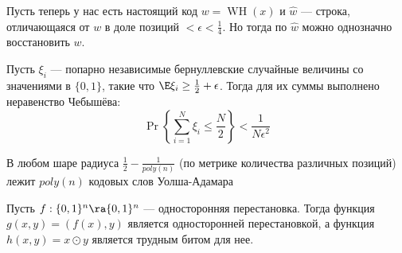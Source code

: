 Пусть теперь у нас есть настоящий код \(w = \operatorname{WH}(x)\) и \(\hat w\) --- строка, отличающаяся от \(w\) в доле позиций \(< \epsilon < \frac{1}{4}\). Но тогда по \(\hat w\) можно однозначно восстановить \(w\).

\begin{reminder}
    Пусть $\xi_i$ — попарно независимые бернуллевские случайные величины со значениями в $\{0, 1\}$, такие что $\E \xi_i \ge \frac{1}{2} + \epsilon$. Тогда для их суммы выполнено неравенство Чебышёва:
    \[ \Pr\left\{\sum_{i=1}^N \xi_i \le \frac{N}{2}\right\} < \frac{1}{N\epsilon^2} \]
\end{reminder}

\begin{theorem}[б/д]
    В любом шаре радиуса $\frac{1}{2} - \frac{1}{poly(n)}$ (по метрике количества различных позиций) лежит $poly(n)$ кодовых слов Уолша-Адамара
\end{theorem}

\begin{theorem}
    Пусть $f: \{0, 1\}^n \ra \{0, 1\}^n$ — односторонняя перестановка. Тогда функция $g(x, y) = (f(x), y)$ является односторонней перестановкой, а функция $h(x, y) = x \odot y$ является трудным битом для нее.
\end{theorem}

